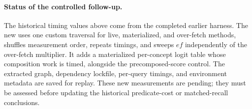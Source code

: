 \paragraph{Status of the controlled follow-up.}
The historical timing values above come from the completed earlier harness. The new  uses one custom traversal for live, materialized, and over-fetch methods, shuffles measurement order, repeats timings, and sweeps $ef$ independently of the over-fetch multiplier. It adds a materialized per-concept logit table whose composition work is timed, alongside the precomposed-score control. The extracted graph, dependency lockfile, per-query timings, and environment metadata are saved for replay. These new measurements are pending; they must be assessed before updating the historical predicate-cost or matched-recall conclusions.
